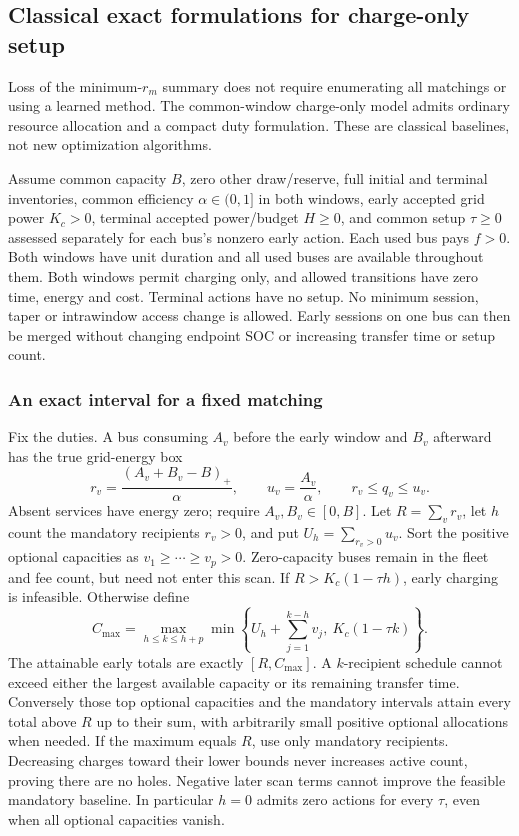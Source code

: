 \subsection{Classical exact formulations for charge-only setup}
\label{app:setupchargeonly}
Loss of the minimum-$r_m$ summary does not require enumerating all matchings
or using a learned method. The common-window charge-only model admits
ordinary resource allocation and a compact duty formulation.
These are classical baselines, not new optimization algorithms.

Assume common capacity $B$, zero other draw/reserve, full initial and
terminal inventories, common efficiency $\alpha\in(0,1]$ in both windows,
early accepted grid power $K_c>0$, terminal accepted power/budget $H\ge0$,
and common setup $\tau\ge0$ assessed separately for each bus's nonzero
early action. Each used bus pays $f>0$. Both windows
have unit duration and all used buses are available throughout them.
Both windows permit charging only, and allowed transitions have zero
time, energy and cost. Terminal actions have no setup. No minimum session, taper or intrawindow
access change is allowed. Early sessions on one bus can then be merged
without changing endpoint SOC or increasing transfer time or setup count.

\subsubsection{An exact interval for a fixed matching}
Fix the duties. A bus consuming $A_v$ before the early window and $B_v$
afterward has the true grid-energy box
\[
 r_v=\frac{(A_v+B_v-B)_+}{\alpha},\qquad
 u_v=\frac{A_v}{\alpha},\qquad r_v\le q_v\le u_v.
\]
Absent services have energy zero; require $A_v,B_v\in[0,B]$.
Let $R=\sum_vr_v$, let $h$ count the mandatory recipients $r_v>0$,
and put $U_h=\sum_{r_v>0}u_v$. Sort the positive optional capacities
as $v_1\ge\cdots\ge v_p>0$. Zero-capacity buses remain in the fleet
and fee count, but need not enter this scan. If
$R>K_c(1-\tau h)$, early charging is infeasible. Otherwise define
\[
 C_{\max}=\max_{h\le k\le h+p}
 \min\left\{U_h+\sum_{j=1}^{k-h}v_j,\ K_c(1-\tau k)\right\}.
\]
The attainable early totals are exactly $[R,C_{\max}]$. A $k$-recipient
schedule cannot exceed either the largest available capacity or its
remaining transfer time. Conversely those top optional capacities and
the mandatory intervals attain every total above $R$ up to their sum,
with arbitrarily small positive optional allocations when needed. If
the maximum equals $R$, use only mandatory recipients. Decreasing charges
toward their lower bounds never increases active count, proving there
are no holes. Negative later scan terms cannot improve the feasible
mandatory baseline. In particular $h=0$ admits zero actions for every
$\tau$, even when all optional capacities vanish.

